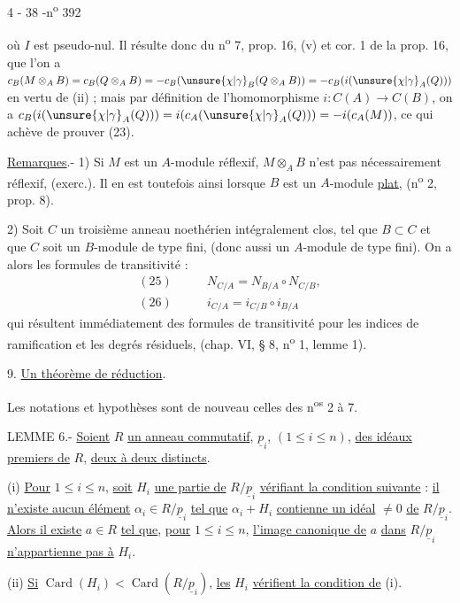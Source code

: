 \begin{center}4 - 38 -\hfill n\textsuperscript{o} 392\end{center}

où $I$ est pseudo-nul. Il résulte donc du n\textsuperscript{o} 7, prop. 16, (v) et cor. 1 de la prop. 16, que l'on a $c_B(M\otimes_A B)=c_B(Q\otimes_A B)=-c_B(\unsure{\chi|\gamma}_B(Q\otimes_A B))=-c_B(i(\unsure{\chi|\gamma}_A(Q)))$ en vertu de (ii) ; mais par définition de l'homomorphisme $i:C(A)\longrightarrow C(B)$, on a $c_B(i(\unsure{\chi|\gamma}_A(Q)))=i(c_A(\unsure{\chi|\gamma}_A(Q)))=-i(c_A(M))$, ce qui achève de prouver (23).

\uline{Remarques}.- 1) Si $M$ est un $A$-module réflexif, $M\otimes_A B$ n'est pas nécessairement réflexif, (exerc.\quad). Il en est toutefois ainsi lorsque $B$ est un $A$-module \uline{plat}, (n\textsuperscript{o} 2, prop. 8).

2) Soit $C$ un troisième anneau noethérien intégralement clos, tel que $B\subset C$ et que $C$ soit un $B$-module de type fini, (donc aussi un $A$-module de type fini). On a alors les formules de transitivité :
\[
\begin{aligned}
(25)\qquad &N_{C/A}=N_{B/A}\circ N_{C/B},\\
(26)\qquad &i_{C/A}=i_{C/B}\circ i_{B/A}
\end{aligned}
\]
qui résultent immédiatement des formules de transitivité pour les indices de ramification et les degrés résiduels, (chap. VI, § 8, n\textsuperscript{o} 1, lemme 1).

9. \uline{Un théorème de réduction}.

Les notations et hypothèses sont de nouveau celles des n\textsuperscript{os} 2 à 7.

LEMME 6.- \uline{Soient} $R$ \uline{un anneau commutatif}, $\underline{p}_i$, $(1\le i\le n)$, \uline{des idéaux premiers de} $R$, \uline{deux à deux distincts}.

(i) \uline{Pour} $1\le i\le n$, \uline{soit} $H_i$ \uline{une partie de} $R/\underline{p}_i$ \uline{vérifiant la condition suivante} : \uline{il n'existe aucun élément} $\alpha_i\in R/\underline{p}_i$ \uline{tel que} $\alpha_i+H_i$ \uline{contienne un idéal} $\ne0$ \uline{de} $R/\underline{p}_i$. \uline{Alors il existe} $a\in R$ \uline{tel que}, \uline{pour} $1\le i\le n$, \uline{l'image canonique de} $a$ \uline{dans} $R/\underline{p}_i$ \uline{n'appartienne pas à} $H_i$.

(ii) \uline{Si} $\operatorname{Card}(H_i)<\operatorname{Card}(R/\underline{p}_i)$, \uline{les} $H_i$ \uline{vérifient la condition de} (i).

